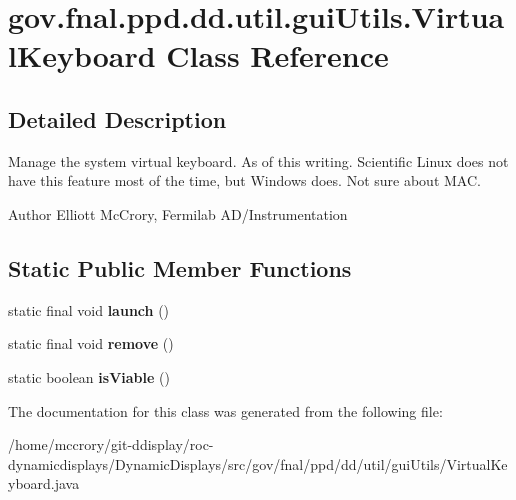 \hypertarget{classgov_1_1fnal_1_1ppd_1_1dd_1_1util_1_1guiUtils_1_1VirtualKeyboard}{\section{gov.\-fnal.\-ppd.\-dd.\-util.\-gui\-Utils.\-Virtual\-Keyboard Class Reference}
\label{classgov_1_1fnal_1_1ppd_1_1dd_1_1util_1_1guiUtils_1_1VirtualKeyboard}
}


\subsection{Detailed Description}
Manage the system virtual keyboard. As of this writing. Scientific Linux does not have this feature most of the time, but Windows does. Not sure about M\-A\-C.

\begin{DoxyAuthor}{Author}
Elliott Mc\-Crory, Fermilab A\-D/\-Instrumentation 
\end{DoxyAuthor}
\subsection*{Static Public Member Functions}
\begin{DoxyCompactItemize}
\item 
\hypertarget{classgov_1_1fnal_1_1ppd_1_1dd_1_1util_1_1guiUtils_1_1VirtualKeyboard_a9fd433156506d4941931cd57f30e30cc}{static final void {\bfseries launch} ()}\label{classgov_1_1fnal_1_1ppd_1_1dd_1_1util_1_1guiUtils_1_1VirtualKeyboard_a9fd433156506d4941931cd57f30e30cc}

\item 
\hypertarget{classgov_1_1fnal_1_1ppd_1_1dd_1_1util_1_1guiUtils_1_1VirtualKeyboard_a0b339889e908be4ef22fb75ec48ce82f}{static final void {\bfseries remove} ()}\label{classgov_1_1fnal_1_1ppd_1_1dd_1_1util_1_1guiUtils_1_1VirtualKeyboard_a0b339889e908be4ef22fb75ec48ce82f}

\item 
\hypertarget{classgov_1_1fnal_1_1ppd_1_1dd_1_1util_1_1guiUtils_1_1VirtualKeyboard_a6de1d707a87c165fe832b796e6a5b7ef}{static boolean {\bfseries is\-Viable} ()}\label{classgov_1_1fnal_1_1ppd_1_1dd_1_1util_1_1guiUtils_1_1VirtualKeyboard_a6de1d707a87c165fe832b796e6a5b7ef}

\end{DoxyCompactItemize}


The documentation for this class was generated from the following file\-:\begin{DoxyCompactItemize}
\item 
/home/mccrory/git-\/ddisplay/roc-\/dynamicdisplays/\-Dynamic\-Displays/src/gov/fnal/ppd/dd/util/gui\-Utils/Virtual\-Keyboard.\-java\end{DoxyCompactItemize}
